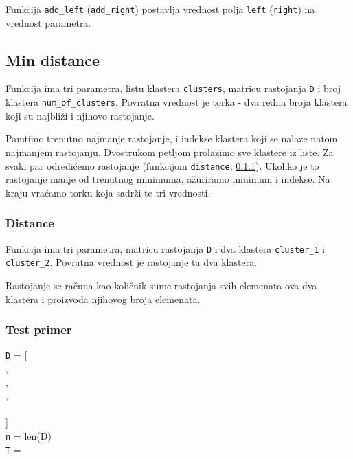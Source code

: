 Funkcija \texttt{add\_left} (\texttt{add\_right}) postavlja vrednost polja \texttt{left} (\texttt{right}) na vrednost parametra.




\subsection{Min distance}
\label{minDistance}

Funkcija ima tri parametra, listu klastera \texttt{clusters}, matricu rastojanja \texttt{D} i broj klastera \texttt{num\_of\_clusters}. Povratna vrednost je torka - dva redna broja klastera koji su najbliži i njihovo rastojanje.

Pamtimo trenutno najmanje rastojanje, i indekse klastera koji se nalaze natom najmanjem rastojanju. Dvostrukom petljom prolazimo sve klastere iz liste. Za svaki par odredićemo rastojanje (funkcijom \texttt{distance}, \ref{distance2}). Ukoliko je to rastojanje manje od trenutnog minimuma, ažuriramo minimum i indekse. Na kraju vraćamo torku koja sadrži te tri vrednosti.





\subsubsection{Distance}
\label{distance2}

Funkcija ima tri parametra, matricu rastojanja \texttt{D} i dva klastera \texttt{cluster\_1} i \texttt{cluster\_2}. Povratna vrednost je rastojanje ta dva klastera.

Rastojanje se računa kao količnik sume rastojanja svih elemenata ova dva klastera i proizvoda njihovog broja elemenata.







\subsubsection{Test primer}

\noindent \texttt{D} = [
\\\indent[0,  13, 21, 22],
\\\indent[13,  0, 12, 13],
\\\indent[21, 12,  0, 13],
\\\indent[22, 13, 13,  0]
\\]
\\\texttt{n} = len(D)
\\\texttt{T} = 
